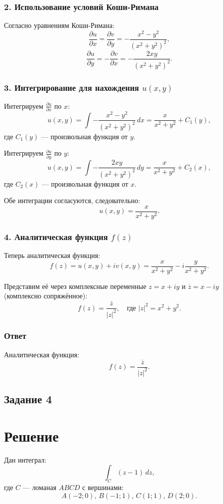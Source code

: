 \documentclass[a4paper,12pt]{article}
\begin{document}
\subsubsection*{2. Использование условий Коши-Римана}
Согласно уравнениям Коши-Римана:
\[
\frac{\partial u}{\partial x} = \frac{\partial v}{\partial y} = -\frac{x^2 - y^2}{(x^2 + y^2)^2},
\]
\[
\frac{\partial u}{\partial y} = -\frac{\partial v}{\partial x} = -\frac{2xy}{(x^2 + y^2)^2}.
\]

\subsubsection*{3. Интегрирование для нахождения \(u(x, y)\)}
Интегрируем \(\frac{\partial u}{\partial x}\) по \(x\):
\[
u(x, y) = \int -\frac{x^2 - y^2}{(x^2 + y^2)^2} \, dx = \frac{x}{x^2 + y^2} + C_1(y),
\]
где \(C_1(y)\) — произвольная функция от \(y\).

Интегрируем \(\frac{\partial u}{\partial y}\) по \(y\):
\[
u(x, y) = \int -\frac{2xy}{(x^2 + y^2)^2} \, dy = \frac{x}{x^2 + y^2} + C_2(x),
\]
где \(C_2(x)\) — произвольная функция от \(x\).

Обе интеграции согласуются, следовательно:
\[
u(x, y) = \frac{x}{x^2 + y^2}.
\]

\subsubsection*{4. Аналитическая функция \(f(z)\)}
Теперь аналитическая функция:
\[
f(z) = u(x, y) + iv(x, y) = \frac{x}{x^2 + y^2} - i\frac{y}{x^2 + y^2}.
\]

Представим её через комплексные переменные \(z = x + iy\) и \(\overline{z} = x - iy\) (комплексно сопряжённое):
\[
f(z) = \frac{\overline{z}}{|z|^2}, \quad \text{где } |z|^2 = x^2 + y^2.
\]

\subsubsection*{Ответ}
Аналитическая функция:
\[
f(z) = \frac{\overline{z}}{|z|^2}.
\]

\subsection*{Задание 4}

\section*{Решение}
Дан интеграл:
\[
\int_C (z - 1) \, dz,
\]
где \( C \) — ломаная \( ABCD \) с вершинами:
\[
A(-2; 0), \, B(-1; 1), \, C(1; 1), \, D(2; 0).
\]
\end{document}
